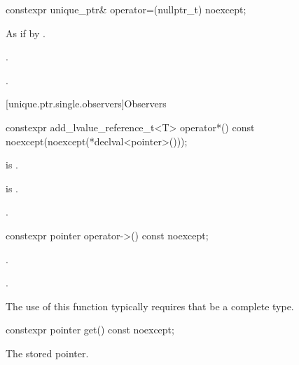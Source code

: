 %
\begin{itemdecl}
constexpr unique_ptr& operator=(nullptr_t) noexcept;
\end{itemdecl}

\begin{itemdescr}
\pnum
\effects
As if by .

\pnum
\ensures
{}.

\pnum
\returns
{}.
\end{itemdescr}

[unique.ptr.single.observers]{Observers}

%
\begin{itemdecl}
constexpr add_lvalue_reference_t<T> operator*() const noexcept(noexcept(*declval<pointer>()));
\end{itemdecl}

\begin{itemdescr}
\pnum
\mandates
{} is .

\pnum
\expects
{} is .

\pnum
\returns
{}.

\end{itemdescr}

%
\begin{itemdecl}
constexpr pointer operator->() const noexcept;
\end{itemdecl}

\begin{itemdescr}
\pnum
\expects
{}.

\pnum
\returns
{}.

\pnum
\begin{note}
The use of this function typically requires that  be a complete type.
\end{note}
\end{itemdescr}

%
\begin{itemdecl}
constexpr pointer get() const noexcept;
\end{itemdecl}

\begin{itemdescr}
\pnum
\returns
The stored pointer.
\end{itemdescr}

